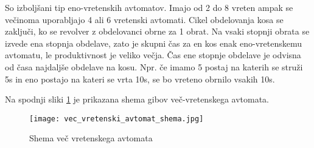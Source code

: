 So izboljšani tip eno-vretenskih avtomatov. Imajo od 
2 do 8 vreten ampak se večinoma uporabljajo 4 ali 6 
vretenski avtomati. Cikel obdelovanja kosa se zaključi, 
ko se revolver z obdelovanci obrne za 1 obrat. Na vsaki stopnji 
obrata se izvede ena stopnja obdelave, zato je skupni čas za en 
kos enak eno-vretenskemu avtomatu, le produktivnost je veliko 
večja. Čas ene stopnje obdelave je odvisna od časa najdaljše 
obdelave na kosu. Npr. če imamo 5 postaj na katerih se struži 5s 
in eno postajo na kateri se vrta 10s, se bo vreteno obrnilo vsakih 10s.

Na spodnji sliki \ref{vec_vretenc} je prikazana shema gibov več-vretenskega
avtomata.

\begin{figure}[H]
    \begin{center}
        \texttt{[image: vec\_vretenski\_avtomat\_shema.jpg]}
        \caption{Shema več vretenskega avtomata
                \cite{vec_vretenska_struznica_shema}}
        \label{vec_vretenc}
    \end{center}
\end{figure}

\newpage